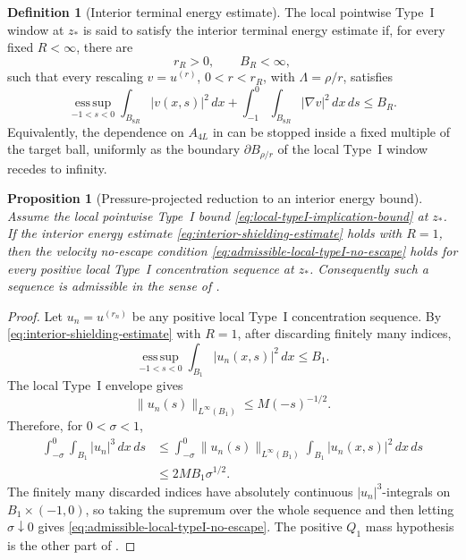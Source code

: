 \documentclass[11pt]{amsart}
\numberwithin{equation}{section}
\theoremstyle{plain}
\newtheorem{proposition}[proposition]{Proposition}
\theoremstyle{definition}
\newtheorem{definition}[definition]{Definition}
\theoremstyle{remark}
\newcommand{\esssup}{\operatorname*{ess\,sup}}
\begin{document}
\begin{definition}[Interior terminal energy estimate]
\label{def:interior-shielding-estimate}
The local pointwise Type~I window at \(z_*\) is said to satisfy the interior
terminal energy estimate if, for every fixed \(R<\infty\), there are
\[
   r_R>0,\qquad B_R<\infty,
\]
such that every rescaling \(v=u^{(r)}\), \(0<r<r_R\), with
\(\Lambda=\rho/r\), satisfies
\begin{equation}\label{eq:interior-shielding-estimate}
   \esssup_{-1<s<0}\int_{B_{8R}}|v(x,s)|^2\,dx
   +\int_{-1}^{0}\int_{B_{8R}}|\nabla v|^2\,dx\,ds
   \le B_R .
\end{equation}
Equivalently, the dependence on \(A_{4L}\) in
 can be stopped inside a fixed
multiple of the target ball, uniformly as the boundary
\(\partial B_{\rho/r}\) of the local Type~I window recedes to infinity.
\end{definition}

\begin{proposition}[Pressure-projected reduction to an interior energy bound]
\label{prop:pressure-projection-reduces-to-shielding}
Assume the local pointwise Type~I bound \eqref{eq:local-typeI-implication-bound} at
\(z_*\).  If the interior energy estimate
\eqref{eq:interior-shielding-estimate} holds with \(R=1\), then the velocity
no-escape condition \eqref{eq:admissible-local-typeI-no-escape} holds for every
positive local Type~I concentration sequence at \(z_*\).  Consequently such a
sequence is admissible in the sense of
.
\end{proposition}

\begin{proof}
Let \(u_n=u^{(r_n)}\) be any positive local Type~I concentration sequence.  By
\eqref{eq:interior-shielding-estimate} with \(R=1\), after discarding finitely
many indices,
\[
   \esssup_{-1<s<0}\int_{B_1}|u_n(x,s)|^2\,dx\le B_1 .
\]
The local Type~I envelope gives
\[
   \|u_n(s)\|_{L^\infty(B_1)}\le M(-s)^{-1/2}.
\]
Therefore, for \(0<\sigma<1\),
\[
\begin{aligned}
   \int_{-\sigma}^{0}\int_{B_1}|u_n|^3\,dx\,ds
   &\le
   \int_{-\sigma}^{0}
      \|u_n(s)\|_{L^\infty(B_1)}
      \int_{B_1}|u_n(x,s)|^2\,dx\,ds    \\
   &\le
   2MB_1\sigma^{1/2}.
\end{aligned}
\]
The finitely many discarded indices have absolutely continuous
\(|u_n|^3\)-integrals on \(B_1\times(-1,0)\), so taking the supremum over the
whole sequence and then letting \(\sigma\downarrow0\) gives
\eqref{eq:admissible-local-typeI-no-escape}.  The positive \(Q_1\) mass
hypothesis is the other part of
.
\end{proof}
\end{document}
